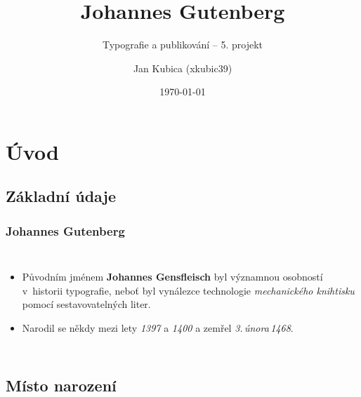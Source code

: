 \documentclass[brown]{beamer}
\title{Johannes Gutenberg}
\subtitle{Typografie a publikování -- 5. projekt}
\author{Jan Kubica (xkubic39)}
\institute{Fakulta informačních technologií VUT v Brně}
\date{\today}
\begin{document}
\begin{frame}
  \titlepage
\end{frame}

\section{Úvod}

\subsection{Základní údaje}

\begin{frame}

  \frametitle{Johannes Gutenberg}

    \begin{columns}[c]
  	\column{2in}
  	\begin{itemize}
  \item Původním jménem \textbf{Johannes Gensfleisch} byl významnou osobností v~historii typografie, neboť byl vynálezce technologie \emph{mechanického knihtisku} pomocí sestavovatelných liter.
  \item Narodil se někdy mezi lety \emph{1397} a \emph{1400} a zemřel \emph{3.\,února\,1468}.
    \end{itemize}
  	\column{2in}
  \end{columns}

\end{frame}

\subsection{Místo narození}
\end{document}
